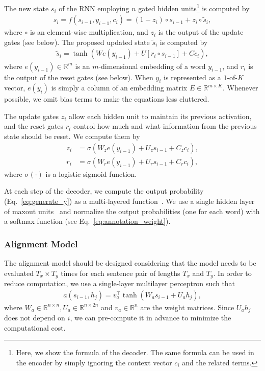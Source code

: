\documentclass{article}
\newcommand{\RR}[0]{\mathbb{R}}
\begin{document}
The new state $s_i$ of the RNN employing $n$ gated hidden units\footnote{
    Here, we show the formula of the decoder. The same formula can be used in
    the encoder by simply ignoring the context vector $c_i$ and the related
    terms.
}
is computed by
\begin{align*}
    s_i = f(s_{i-1}, y_{i-1}, c_i) = (1 - z_i) \circ s_{i-1} + z_i \circ \tilde{s}_{i},
\end{align*}
where $\circ$ is an element-wise multiplication, and $z_i$ is the output of the
update gates (see below). The proposed updated state $\tilde{s}_{i}$ is computed
by
\begin{align*}
    \tilde{s}_{i} = \tanh \left( W e(y_{i - 1}) + U \left[ r_i \circ s_{i - 1} \right] +
    C c_i \right),
\end{align*}
where $e(y_{i-1}) \in \RR^{m}$ is an $m$-dimensional embedding of a word
$y_{i-1}$, and $r_i$ is the output of the reset gates (see below).  When $y_i$
is represented as a $1$-of-$K$ vector, $e(y_i)$ is simply a column of an
embedding matrix $E \in \RR^{m \times K}$. Whenever possible, we omit bias terms
to make the equations less cluttered.

The update gates $z_i$ allow each hidden unit to maintain its previous
activation, and the reset gates $r_i$ control how much and what information from
the previous state should be reset. We compute them by
\begin{align*}
    z_i &= \sigma \left( W_{z} e(y_{i - 1}) + U_{z} s_{i - 1} + C_{z} c_i\right), \\
    r_i &= \sigma \left( W_{r} e(y_{i - 1}) + U_{r} s_{i - 1} + C_{r} c_i\right),
\end{align*}
where $\sigma\left(\cdot\right)$ is a logistic sigmoid function.

At each step of the decoder, we compute the output probability
(Eq.~\eqref{eq:generate_y}) as a multi-layered function~\citep{Pascanu2014rec}.
We use a single hidden layer of maxout units~\citep{Goodfellow2013} and
normalize the output probabilities (one for each word) with a softmax function
(see Eq.~\eqref{eq:annotation_weight}).

\subsubsection{Alignment Model}

The alignment model should be designed considering that the model needs to be
evaluated $T_x \times T_y$ times for each sentence pair of lengths $T_x$ and
$T_y$. In order to reduce computation, we use a single-layer multilayer
perceptron such that 
\begin{align*}
    a(s_{i-1}, h_j) = v_a^{\top} \tanh\left( W_a s_{i-1} + U_a h_j \right),
\end{align*}
where $W_a \in \RR^{n\times n}, U_a \in \RR^{n\times 2n}$ and $v_a \in \RR^{n}$
are the weight matrices. Since $U_a h_j$ does not depend on $i$, we can
pre-compute it in advance to minimize the computational cost. 
\end{document}
